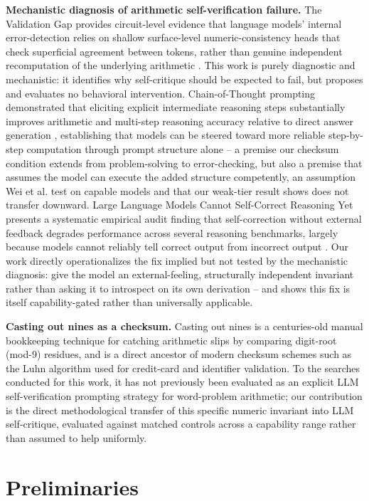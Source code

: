 \documentclass[11pt,letterpaper]{article}
\begin{document}
\textbf{Mechanistic diagnosis of arithmetic self-verification failure.} The Validation Gap provides circuit-level evidence that language models' internal error-detection relies on shallow surface-level numeric-consistency heads that check superficial agreement between tokens, rather than genuine independent recomputation of the underlying arithmetic \citep{Bertolazzi2025}. This work is purely diagnostic and mechanistic: it identifies why self-critique should be expected to fail, but proposes and evaluates no behavioral intervention. Chain-of-Thought prompting demonstrated that eliciting explicit intermediate reasoning steps substantially improves arithmetic and multi-step reasoning accuracy relative to direct answer generation \citep{Wei2022}, establishing that models can be steered toward more reliable step-by-step computation through prompt structure alone -- a premise our checksum condition extends from problem-solving to error-checking, but also a premise that assumes the model can execute the added structure competently, an assumption Wei et al. test on capable models and that our weak-tier result shows does not transfer downward. Large Language Models Cannot Self-Correct Reasoning Yet presents a systematic empirical audit finding that self-correction without external feedback degrades performance across several reasoning benchmarks, largely because models cannot reliably tell correct output from incorrect output \citep{Huang2023}. Our work directly operationalizes the fix implied but not tested by the mechanistic diagnosis: give the model an external-feeling, structurally independent invariant rather than asking it to introspect on its own derivation -- and shows this fix is itself capability-gated rather than universally applicable.

\textbf{Casting out nines as a checksum.} Casting out nines is a centuries-old manual bookkeeping technique for catching arithmetic slips by comparing digit-root (mod-9) residues, and is a direct ancestor of modern checksum schemes such as the Luhn algorithm used for credit-card and identifier validation. To the searches conducted for this work, it has not previously been evaluated as an explicit LLM self-verification prompting strategy for word-problem arithmetic; our contribution is the direct methodological transfer of this specific numeric invariant into LLM self-critique, evaluated against matched controls across a capability range rather than assumed to help uniformly.

\section{Preliminaries}
\end{document}
